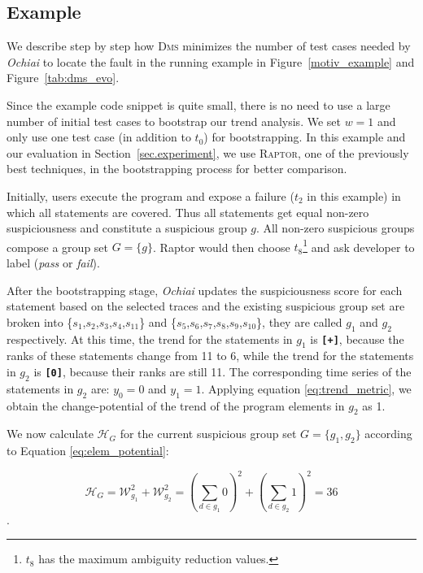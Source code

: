 \subsection{Example}
We describe step by step how \textsc{Dms} minimizes the number of test cases needed by {\em Ochiai} to locate
the fault in the running example in Figure~\ref{motiv_example} and Figure~\ref{tab:dms_evo}.

Since the example code snippet is quite small, there is no need to use a large number of initial test cases to bootstrap our trend analysis. %
We set $w=1$ and only use one test case (in addition to $t_0$) for bootstrapping. In this example and our evaluation in Section~\ref{sec.experiment}, we use \textsc{Raptor}, one of the previously best techniques, in the bootstrapping process for better comparison.

Initially, users execute the program and expose a failure ($t_2$ in this example) in which all statements are covered.
Thus all statements get equal non-zero suspiciousness and constitute a suspicious group $g$. All non-zero suspicious groups compose a group set $G = \{g\}$.
{\sc Raptor} would then choose $t_8$\footnote{$t_8$ has the maximum ambiguity reduction values.} and ask developer to label ({\em pass} or {\em fail}).


After the bootstrapping stage, {\em Ochiai} updates the suspiciousness score for each statement based on the selected traces
and the existing suspicious group set are broken into \{$s_{1}$,$s_{2}$,$s_{3}$,$s_{4}$,$s_{11}$\} and \{$s_{5}$,$s_{6}$,$s_{7}$,$s_{8}$,$s_{9}$,$s_{10}$\}, they are
called $g_{1}$ and $g_{2}$ respectively.
At this time, the trend for the statements in $g_{1}$ is {\bf\texttt{[+]}}, because the ranks of these statements change from 11 to 6, while the trend for the statements in $g_{2}$
is {\bf\texttt{[0]}}, because their ranks are still 11.
The corresponding time series of the statements in $g_{2}$ are:
$y_{0} = 0$ and $ y_{1} = 1$. Applying equation \ref{eq:trend_metric}, we obtain the change-potential of the trend of the program elements in $g_{2}$ as 1.


We now calculate $\mathcal{H}_{G}$ for the current suspicious group set $G=\{g_{1},g_{2}\}$ according to Equation \ref{eq:elem_potential}:

\[\mathcal{H}_{G} = \mathcal{W}_{g_{1}}^{2} + \mathcal{W}_{g_{2}}^{2}  = (\sum_{d \in g_{1}}{0})^{2} + (\sum_{d \in g_{2}}{1})^{2} = 36\].

